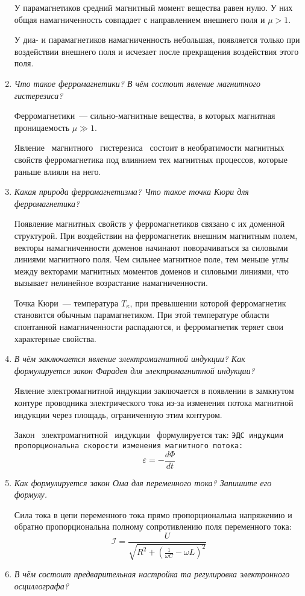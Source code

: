 \documentclass[paper=a4,10pt,pagesize]{scrartcl}
\begin{document}
\begin{enumerate}
У парамагнетиков средний магнитный момент вещества равен нулю.
У них общая намагниченность совпадает с направлением внешнего поля и $\mu >1$.

У диа- и парамагнетиков намагниченность небольшая, появляется только при воздействии внешнего поля и исчезает после прекращения воздействия этого поля.
\item \textit{Что такое ферромагнетики? В чём состоит явление магнитного гистерезиса?}

Ферромагнетики~--- сильно-магнитные вещества, в которых магнитная проницаемость $\mu\gg1$.

Явление ~магнитного ~гистерезиса ~состоит в необратимости магнитных свойств ферромагнетика под влиянием тех магнитных процессов, которые раньше влияли на него.
\item \textit{Какая природа ферромагнетизма? Что такое точка Кюри для ферромагнетика? }

Появление магнитных свойств у ферромагнетиков связано с их доменной структурой.
При воздействии на ферромагнетик внешним магнитным полем, векторы намагниченности доменов начинают поворачиваться за силовыми линиями магнитного поля.
Чем сильнее магнитное поле, тем меньше углы между векторами магнитных моментов доменов и силовыми линиями, что вызывает нелинейное возрастание намагниченности.

Точка Кюри~--- температура $T_\kappa$, при превышении которой ферромагнетик становится обычным парамагнетиком.
При этой температуре области спонтанной намагниченности распадаются, и ферромагнетик теряет свои характерные свойства.
\item \textit{В чём заключается явление электромагнитной индукции? Как формулируется закон Фарадея для электромагнитной индукции? }

Явление электромагнитной индукции заключается в появлении в замкнутом контуре проводника электрического тока из-за изменения потока магнитной индукции через площадь, ограниченную этим контуром.

Закон ~электромагнитной ~индукции ~формулируется так: \texttt{ЭДС индукции пропорциональна скорости изменения магнитного потока:}
$$\varepsilon = -\frac{d\Phi}{dt}$$
\item \textit{Как формулируется закон Ома для переменного тока? Запишите его формулу.}

Сила тока в цепи переменного тока прямо пропорциональна напряжению и обратно пропорциональна полному сопротивлению поля переменного тока:
$$\mathcal{I} = \frac{U}{\sqrt{R^2+\left(\frac{1}{\omega C} - \omega L\right)^2}}$$
\item \textit{В чём состоит предварительная настройка та регулировка электронного осциллографа?}


\end{enumerate}
\end{document}

